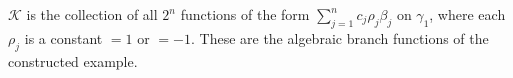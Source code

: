 
$\mathcal{K}$ is the collection of all $2^n$ functions of the form $\sum_{j=1}^{n} c_j \rho_j \beta_j$ on $\gamma_1$, where each $\rho_j$ is a constant $= 1$ or $= -1$. These are the algebraic branch functions of the constructed example.
